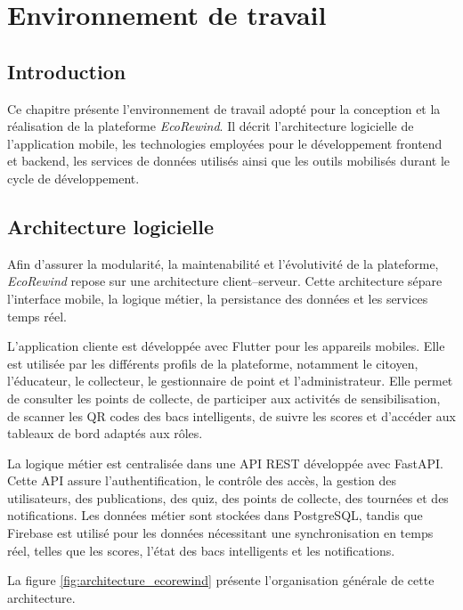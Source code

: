 \chapter{Environnement de travail}
\label{chap:environnement_travail}

\section{Introduction}

Ce chapitre présente l'environnement de travail adopté pour la conception et la réalisation de la plateforme \textit{EcoRewind}. Il décrit l'architecture logicielle de l'application mobile, les technologies employées pour le développement frontend et backend, les services de données utilisés ainsi que les outils mobilisés durant le cycle de développement.

\section{Architecture logicielle}
\label{sec:architecture_logicielle}

Afin d'assurer la modularité, la maintenabilité et l'évolutivité de la plateforme, \textit{EcoRewind} repose sur une architecture client--serveur. Cette architecture sépare l'interface mobile, la logique métier, la persistance des données et les services temps réel.

L'application cliente est développée avec Flutter pour les appareils mobiles. Elle est utilisée par les différents profils de la plateforme, notamment le citoyen, l'éducateur, le collecteur, le gestionnaire de point et l'administrateur. Elle permet de consulter les points de collecte, de participer aux activités de sensibilisation, de scanner les QR codes des bacs intelligents, de suivre les scores et d'accéder aux tableaux de bord adaptés aux rôles.

La logique métier est centralisée dans une API REST développée avec FastAPI. Cette API assure l'authentification, le contrôle des accès, la gestion des utilisateurs, des publications, des quiz, des points de collecte, des tournées et des notifications. Les données métier sont stockées dans PostgreSQL, tandis que Firebase est utilisé pour les données nécessitant une synchronisation en temps réel, telles que les scores, l'état des bacs intelligents et les notifications.

La figure \ref{fig:architecture_ecorewind} présente l'organisation générale de cette architecture.

